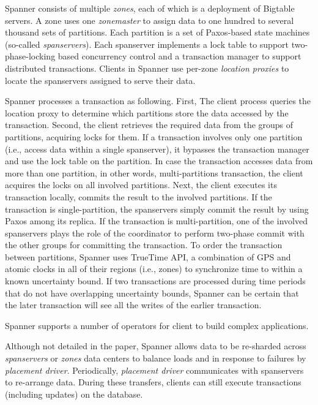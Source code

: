 Spanner consists of multiple \emph{zones}, each of which is a
deployment of Bigtable servers. A zone uses one \emph{zonemaster} to assign data
to one hundred to several thousand sets of partitions. Each partition is a set
of Paxos-based state machines (so-called \emph{spanservers}). Each spanserver
implements a lock table to support two-phase-locking based concurrency control
and a transaction manager to support distributed transactions. Clients in
Spanner use per-zone \emph{location proxies} to locate the spanservers assigned
to serve their data.

Spanner processes a transaction as following. First, The client process queries
the location proxy to determine which partitions store the data accessed by the
transaction. Second, the client retrieves the required data from the groups of
partitions, acquiring locks for them. If a transaction involves only one
partition (i.e., access data within a single spanserver), it bypasses the
transaction manager and use the lock table on the partition. In case the
transaction accesses data from more than one partition, in other words,
multi-partitions transaction, the client acquires the locks on all involved
partitions. Next, the client executes its transaction locally, commits the
result to the involved partitions. If the transaction is single-partition, the
spanservers simply commit the result by using Paxos among its replica. If the
transaction is multi-partition, one of the involved spanservers plays the role
of the coordinator to perform two-phase commit with the other groups for
committing the transaction. To order the transaction between partitions, Spanner
uses TrueTime API, a combination of GPS and atomic clocks in all of their regions (i.e.,
zones) to synchronize time to within a known uncertainty bound. If two
transactions are processed during time periods that do not have overlapping
uncertainty bounds, Spanner can be certain that the later transaction will see
all the writes of the earlier transaction.

Spanner supports a number of operators for client to build complex applications.

Although not detailed in the paper, Spanner allows data to be re-sharded across
\emph{spanservers} or \emph{zones} data centers to balance loads and in response
to failures by \emph{placement driver}. Periodically, \emph{placement driver}
communicates with spanservers to re-arrange data. During these transfers,
clients can still execute transactions (including updates) on the database.

